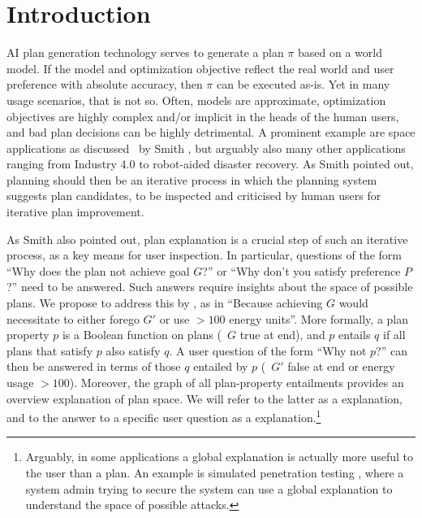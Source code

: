 \section{Introduction}
\label{introduction}

AI plan generation technology serves to generate a plan $\pi$ based on
a world model. If the model and optimization objective reflect the
real world and user preference with absolute accuracy, then $\pi$ can
be executed as-is. Yet in many usage scenarios, that is not so. Often,
models are approximate, optimization objectives are highly complex
and/or implicit in the heads of the human users, and bad plan
decisions can be highly detrimental. A prominent example are space
applications as discussed \eg\ by Smith , but
arguably also many other applications ranging from Industry 4.0 to
robot-aided disaster recovery. As Smith pointed out, planning should
then be an iterative process in which the planning system suggests
plan candidates, to be inspected and criticised by human users for
iterative plan improvement.

As Smith also pointed out, plan explanation is a crucial step of such
an iterative process, as a key means for user inspection. In
particular, questions of the form ``Why does the plan not achieve goal
$G$?'' or ``Why don't you satisfy preference $P$?'' need to be
answered. Such answers require insights about the space of possible
plans. We propose to address this by , as in ``Because achieving $G$ would necessitate to
either forego $G'$ or use $> 100$ energy units''. More formally, a
plan property $p$ is a Boolean function on plans (\eg\ $G$ true at
end), and $p$ entails $q$ if all plans that satisfy $p$ also satisfy
$q$.  A user question of the form ``Why not $p$?'' can then be
answered in terms of those $q$ entailed by $p$ (\eg\ $G'$ false at end
or energy usage $> 100$). Moreover, the graph of all plan-property
entailments provides an overview explanation of plan space. We will
refer to the latter as a  explanation, and to the
answer to a specific user question as a 
explanation.\footnote{Arguably, in some applications a global
  explanation is actually more useful to the user than a plan. An
  example is simulated penetration testing
  \cite{boddy:etal:icaps-05,hoffmann:icaps-15}, where a system admin
  trying to secure the system can use a global explanation to
  understand the space of possible attacks.}

